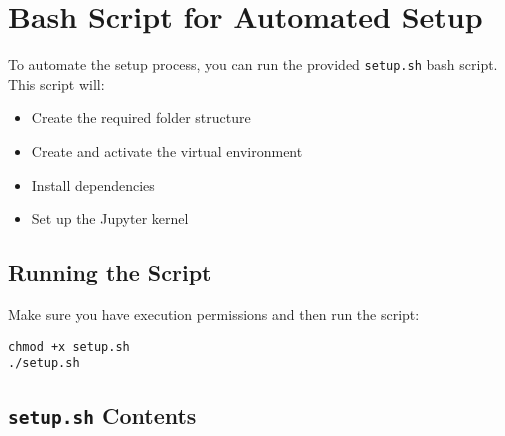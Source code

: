 \documentclass{article}
\begin{document}
\section{Bash Script for Automated Setup}

To automate the setup process, you can run the provided \verb|setup.sh| bash script. This script will:

\begin{itemize}
    \item Create the required folder structure
    \item Create and activate the virtual environment
    \item Install dependencies
    \item Set up the Jupyter kernel
\end{itemize}

\subsection{Running the Script}

Make sure you have execution permissions and then run the script:

\begin{verbatim}
chmod +x setup.sh
./setup.sh
\end{verbatim}

\subsection{\texttt{setup.sh} Contents}
\end{document}
